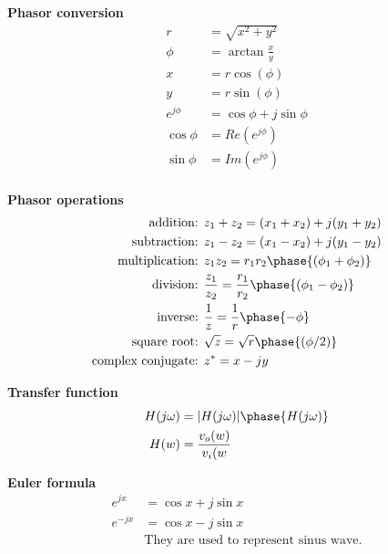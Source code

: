 \documentclass{article}
\begin{document}
\textbf{Phasor conversion}
\begin{align*}
    r &= \sqrt{x^2+y^2} \\
    \phi &= \arctan{\frac{x}{y}} \\
    x &= r\cos(\phi) \\
    y &= r\sin(\phi) \\
    e^{j\phi} &= \cos{\phi} + j\sin{\phi} \\
    \cos\phi &= Re(e^{j\phi}) \\
    \sin\phi &= Im(e^{j\phi}) \\
\end{align*}


\textbf{Phasor operations}
\begin{align*}
    \text{addition: }& z_1+z_2 = (x_1+x_2)+j(y_1+y_2) \\
    \text{subtraction: }& z_1-z_2 = (x_1-x_2)+j(y_1-y_2) \\
    \text{multiplication: }& z_1z_2 = r_1r_2\phase{(\phi_1+\phi_2)} \\
    \text{division: }& \frac{z_1}{z_2} = \frac{r_1}{r_2}\phase{(\phi_1-\phi_2)} \\
    \text{inverse: }& \frac{1}{z} = \frac{1}{r}\phase{-\phi} \\
    \text{square root: }& \sqrt{z} = \sqrt{r}\phase{(\phi/2)} \\
    \text{complex conjugate: }& z^* = x-jy \\
\end{align*}

\textbf{Transfer function}
\begin{align*}
    H(j\omega) &= |H(j\omega)|\phase{H(j\omega)} \\
    H(w) &= \frac{v_o(w)}{v_i(w}
\end{align*}

\textbf{Euler formula}
\begin{align*}
    e^{jx}  &= \cos{x}+j\sin{x} \\
    e^{-jx} &= \cos{x}-j\sin{x} \\
    &\text{They are used to represent sinus wave.}
\end{align*}
\end{document}
